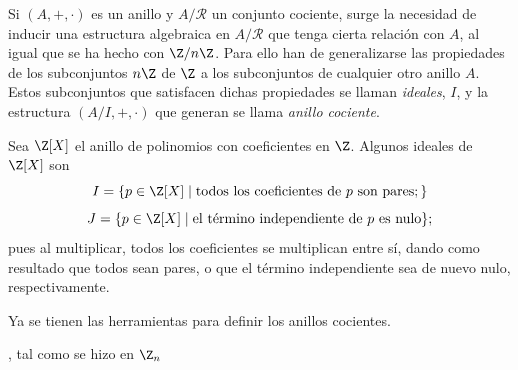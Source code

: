 \begin{TFGampliado}
    Si $(A,+,\cdot)$ es un anillo y $A/\mathcal{R}$ un conjunto cociente, surge la necesidad de inducir una estructura algebraica en $A/\mathcal{R}$ que tenga cierta relación con $A$, al igual que se ha hecho con $\Z/n\Z$. Para ello han de generalizarse las propiedades de los subconjuntos $n\Z$ de $\Z$ a los subconjuntos de cualquier otro anillo $A$. Estos subconjuntos que satisfacen dichas propiedades se llaman \textit{ideales}, $I$, y la estructura $(A/I, +, \cdot)$ que generan se llama \textit{anillo cociente}.
\end{TFGampliado}

\begin{TFGampliado}
            \item Sea $\Z[X]$ el anillo de polinomios con coeficientes en $\Z$. Algunos ideales de $\Z[X]$ son \[I = \{p\in \Z[X] \mid \text{todos los coeficientes de $p$ son pares};\}\] \[J = \{p\in \Z[X] \mid \text{el término independiente de $p$ es nulo}\};\] pues al multiplicar, todos los coeficientes se multiplican entre sí, dando como resultado que todos sean pares, o que el término independiente sea de nuevo nulo, respectivamente.
    \end{TFGampliado}

\begin{TFGampliado}
    Ya se tienen las herramientas para definir los anillos cocientes.
\end{TFGampliado}

\begin{TFGampliado}\hspace{-8pt}, tal como se hizo en $\Z_n$\hspace{4pt}\end{TFGampliado}

